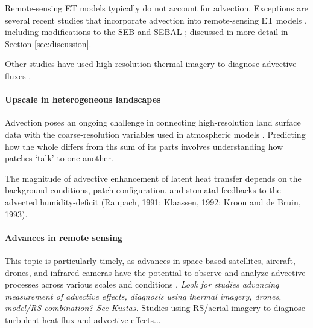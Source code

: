 \documentclass{article}
\begin{document}
    Remote-sensing ET models typically do not account for advection. Exceptions are several recent studies that incorporate advection into remote-sensing ET models  \cite{mkhwanazi2015sebal, liu2016regional},  including modifications to the SEB  \cite{liu2016regional}  and  SEBAL \cite{mkhwanazi2015sebal}; discussed in more detail in Section \ref{sec:discussion}.

    Other studies have used high-resolution thermal imagery to diagnose advective fluxes \cite{wang2024advection}.

    
    \paragraph{Upscale in heterogeneous landscapes}

    Advection poses an ongoing challenge in connecting high-resolution land surface data with the coarse-resolution variables used in atmospheric models \cite{kustas_effects_2003}.
    Predicting how the whole differs from ths sum of its parts involves understanding how patches `talk' to one another.

    
     The magnitude of advective enhancement of latent heat transfer depends on the background conditions, patch configuration, and stomatal feedbacks to the advected humidity-deficit \cite{raupach_averaging_1982}(Raupach, 1991; Klaassen, 1992; Kroon and de Bruin, 1993). 

    

    \paragraph{Advances in remote sensing}

    This topic is particularly timely, as advances in space-based satellites, aircraft, drones, and infrared cameras have the potential to observe and analyze advective processes across various scales and conditions \cite{volk2024assessing, fisher2020ecostress, derardja2024advancements}.   
    \textit{Look for studies advancing measurement of advective effects, diagnosis using thermal imagery, drones, model/RS combination? See Kustas.}
    Studies using RS/aerial imagery to diagnose turbulent heat flux and advective effects...
\end{document}
